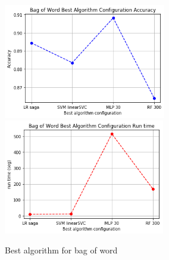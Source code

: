 \documentclass[oneside,onecolumn]{article}
\begin{document}
\begin{figure}[H]
	\centering
	
	\includegraphics[height=5cm]{report_plot/plot_bagofword/best_accuracy.png}
	\includegraphics[height=5cm]{report_plot/plot_bagofword/best_alg_runtime.png}

	\caption{Best algorithm for bag of word} 
	\label{fig:lowmutation}
\end{figure}
\end{document}
